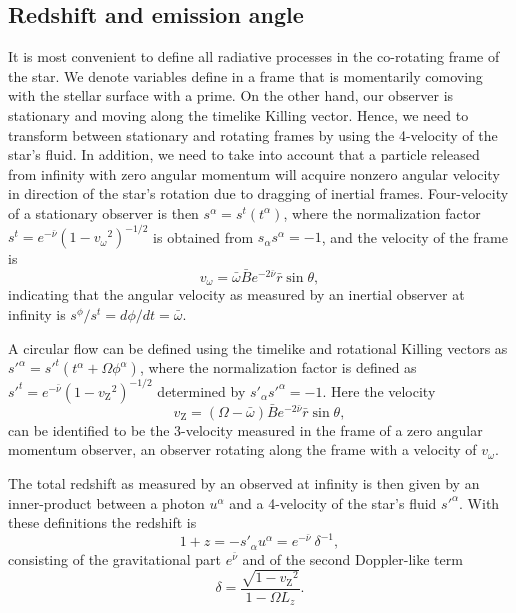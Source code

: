 \documentclass[iop, usenatbib]{emulateapj}
\newcommand{\be}{\begin{equation}}
\newcommand{\ee}{\end{equation}}
\newcommand{\rb}{\ensuremath{\bar{r}}}
\newcommand{\wb}{\ensuremath{\bar{\omega}}}
\newcommand{\nub}{\ensuremath{\bar{\nu}}}
\newcommand{\Bb}{\ensuremath{\bar{B}}}
\newcommand{\vw}{\ensuremath{v_{\omega}}}
\newcommand{\vz}{\ensuremath{v_{\mathrm{Z}}}}
\begin{document}
\subsection{Redshift and emission angle}
It is most convenient to define all radiative processes in the co-rotating
frame of the star.
We denote variables define in a frame that is
momentarily comoving with the stellar surface with a prime.  On the
other hand, our observer is stationary and moving along the timelike
Killing vector.  Hence, we need to transform between stationary and
rotating frames by using the 4-velocity of the star's fluid.  In
addition, we need to take into account that a particle released from
infinity with zero angular momentum will acquire nonzero angular velocity
in direction of the star's rotation due to dragging of inertial frames.
Four-velocity of a stationary observer is then $s^{\alpha} =
s^t(t^{\alpha})$, where the normalization factor $s^t =
e^{-\nub}(1-\vw^2)^{-1/2}$ is obtained from $s_{\alpha}s^{\alpha} = -1$,
and the velocity of the frame is 
\be
\vw = \wb \Bb e^{-2\nub} \rb \sin\theta,
\ee
indicating that the angular velocity as measured by an inertial observer at infinity is $s^{\phi} / s^{t} = d\phi/dt = \wb$.

A circular flow can be defined using the timelike and rotational Killing vectors as $s'^{\alpha} = s'^t (t^{\alpha} + \Omega \phi^{\alpha})$, where the normalization factor is defined as $s'^t = e^{-\nub} (1 - \vz^2)^{-1/2}$ determined by $s'_{\alpha}s'^{\alpha} = -1$.
Here the velocity 
\be
\vz = (\Omega - \wb) \Bb e^{-2\nub} \rb \sin\theta,
\ee
can be identified to be the 3-velocity measured in the frame of a zero angular momentum observer, an observer rotating along the frame with a velocity of $\vw$.

The total redshift as measured by an observed at infinity is then given by an inner-product between a photon $u^{\alpha}$ and a 4-velocity of the star's fluid $s'^{\alpha}$.
With these definitions the redshift is
\be
1 + z = -s'_{\alpha} u^{\alpha} = e^{-\nub} ~\delta^{-1},
\ee
consisting of the gravitational part $e^{\nub}$ and of the second Doppler-like term
\be
\delta = \frac{\sqrt{1-\vz^2}}{1 - \Omega L_z}.
\ee
\end{document}
